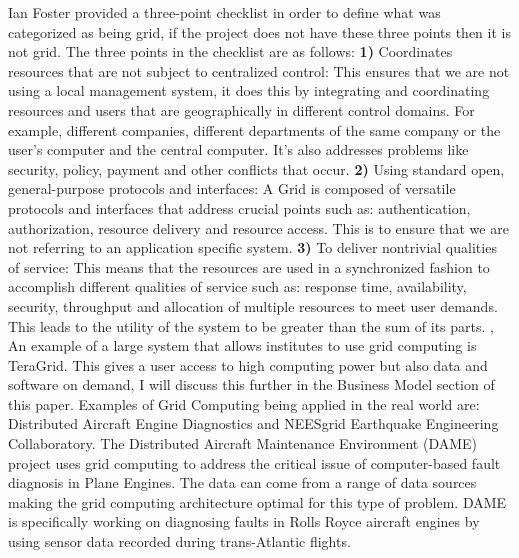 \documentclass[10pt,journal,compsoc]{IEEEtran}
\begin{document}
\hspace{-0.6cm} Ian Foster provided a three-point checklist in order to define what was categorized as being grid, if the project does not have these three points then it is not grid. \cite{GridAndCloud} The three points in the checklist are as follows: \newline
\newline
\textbf{1)} Coordinates resources that are not subject to centralized control: This ensures that we are not using a local management system, it does this by integrating and coordinating resources and users that are geographically in different control domains. For example, different companies, different departments of the same company or the user's computer and the central computer. It's also addresses problems like security, policy, payment and other conflicts that occur.
\newline \newline
\textbf{2)} Using standard open, general-purpose protocols and interfaces: A Grid is composed of versatile protocols and interfaces that address crucial points such as: authentication, authorization, resource delivery and resource access. This is to ensure that we are not referring to an application specific system. 
\newline \newline
\textbf{3)} To deliver nontrivial qualities of service: This means that the resources are used in a synchronized fashion to accomplish different qualities of service such as: response time, availability, security, throughput and allocation of multiple resources to meet user demands. This leads to the utility of the system to be greater than the sum of its parts. \cite{WhatGrid}, \cite{GridAndCloud}
\newline \newline
An example of a large system that allows institutes to use grid computing is TeraGrid. This gives a user access to high computing power but also data and software on demand, I will discuss this further in the Business Model section of this paper. Examples of Grid Computing being applied in the real world are: Distributed Aircraft Engine Diagnostics and NEESgrid Earthquake Engineering Collaboratory. The Distributed Aircraft Maintenance Environment (DAME) project uses grid computing to address the critical issue of computer-based fault diagnosis in Plane Engines. The data can come from a range of data sources making the grid computing architecture optimal for this type of problem. \cite{aircraft} DAME is specifically working on diagnosing faults in Rolls Royce aircraft engines by using sensor data recorded during trans-Atlantic flights. \cite{GridNutShell} \newline
\end{document}
